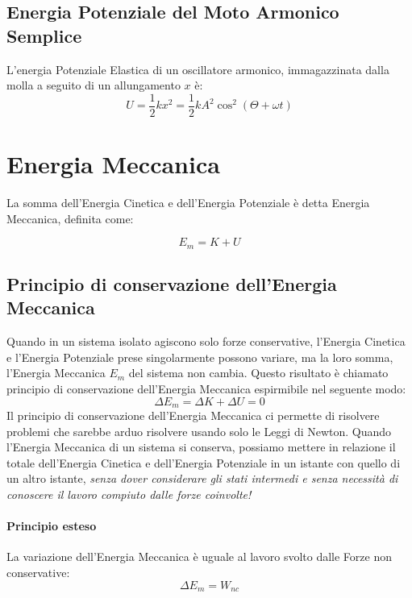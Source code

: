         \subsection{Energia Potenziale del Moto Armonico Semplice} L'energia 
        Potenziale Elastica di un oscillatore armonico, immagazzinata dalla 
        molla a seguito di un allungamento $x$ è:
        \begin{equation}
            U = \frac{1}{2}kx^2 = \frac{1}{2}kA^2\cos^2(\Theta + \omega t)
        \end{equation}

    \section{Energia Meccanica} La somma dell'Energia Cinetica e dell'Energia
    Potenziale è detta Energia Meccanica, definita come:

        \begin{equation}
            E_m = K + U
        \end{equation}

        \subsection{Principio di conservazione dell'Energia Meccanica} Quando in 
        un sistema isolato agiscono solo forze conservative, l'Energia Cinetica 
        e l'Energia Potenziale prese singolarmente possono variare, ma la loro
        somma, l'Energia Meccanica $E_m$ del sistema non cambia. Questo 
        risultato è chiamato principio di conservazione dell'Energia Meccanica
        espirmibile nel seguente modo:
        \begin{equation}
            \Delta E_m = \Delta K + \Delta U = 0
        \end{equation}
        Il principio di conservazione dell'Energia Meccanica ci permette di 
        risolvere problemi che sarebbe arduo risolvere usando solo le Leggi di 
        Newton.
        Quando l'Energia Meccanica di un sistema si conserva, possiamo mettere
        in relazione il totale dell'Energia Cinetica e dell'Energia Potenziale
        in un istante con quello di un altro istante, \textit{senza dover
        considerare gli stati intermedi e senza necessità di conoscere il 
        lavoro compiuto dalle forze coinvolte!}

        \paragraph{Principio esteso} La variazione dell'Energia Meccanica è 
        uguale al lavoro svolto dalle Forze non conservative:
        \begin{equation}
            \Delta E_m = W_{nc}
        \end{equation}
        

